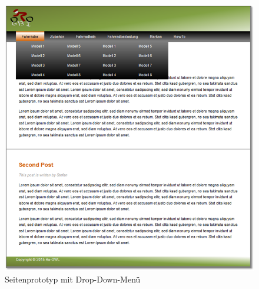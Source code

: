 \begin{figure}[H]
\begin{center}
\includegraphics[width=150mm]{Bilder/Abbildung4-SeitenprototypMitDropDownMenue.png}
\end{center}
\caption{Seitenprototyp mit Drop-Down-Menü}
\label{Abbildung4-Seitenprototyp mit Drop-Down-Menü}
\end{figure}




